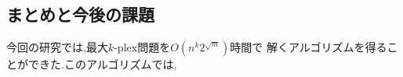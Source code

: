 \documentclass[a4j,twoside]{jarticle}
\begin{document}
\begin{論文概要}
\section{まとめと今後の課題}
今回の研究では,最大$k$-plex問題を$O(n^{k}2^{\sqrt{m}})$時間で
解くアルゴリズムを得ることができた.このアルゴリズムでは,




\clearpage                       %
\end{論文概要}                   %
\end{document}
